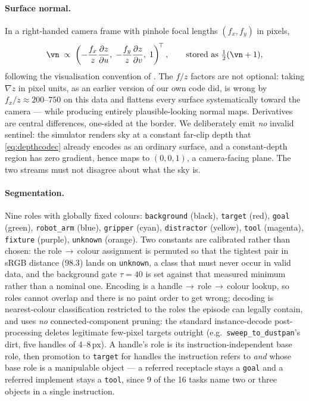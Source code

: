 \documentclass{article} %
\begin{document}
\paragraph{Surface normal.}
In a right-handed camera frame with pinhole focal lengths $(f_x,f_y)$ in pixels,
\begin{equation}
\vn \;\propto\; \left(-\frac{f_x}{z}\frac{\partial z}{\partial u},\;
-\frac{f_y}{z}\frac{\partial z}{\partial v},\; 1\right)^{\!\top},
\qquad \text{stored as } \tfrac12(\vn+1),
\label{eq:normal}
\end{equation}
following the visualisation convention of \citet{zhuang2025argus}. The $f/z$ factors are not
optional: taking $\nabla z$ in pixel units, as an earlier version of our own code did, is wrong by
$f_x/z \approx 200$--$750$ on this data and flattens every surface systematically toward the
camera --- while producing entirely plausible-looking normal maps. Derivatives are central
differences, one-sided at the border. We deliberately emit \emph{no} invalid sentinel: the
simulator renders sky at a constant far-clip depth that \eqref{eq:depthcodec} already encodes as an
ordinary surface, and a constant-depth region has zero gradient, hence maps to $(0,0,1)$, a
camera-facing plane. The two streams must not disagree about what the sky is.

\paragraph{Segmentation.}
Nine roles with globally fixed colours: \texttt{background} (black), \texttt{target} (red),
\texttt{goal} (green), \texttt{robot\_arm} (blue), \texttt{gripper} (cyan), \texttt{distractor}
(yellow), \texttt{tool} (magenta), \texttt{fixture} (purple), \texttt{unknown} (orange). Two
constants are calibrated rather than chosen: the role$\,\to\,$colour assignment is permuted so that
the tightest pair in sRGB distance ($98.3$) lands on \texttt{unknown}, a class that must never occur
in valid data, and the background gate $\tau = 40$ is set against that measured minimum rather than
a nominal one. Encoding is a handle$\,\to\,$role$\,\to\,$colour lookup, so roles cannot overlap and
there is no paint order to get wrong; decoding is nearest-colour classification restricted to the
roles the episode can legally contain, and uses \emph{no} connected-component pruning: the standard instance-decode
post-processing deletes legitimate few-pixel targets outright (e.g.\ \texttt{sweep\_to\_dustpan}'s
dirt, five handles of 4--8\,px). A handle's role is its instruction-independent base role, then
promotion to \texttt{target} for handles the instruction refers to \emph{and} whose base role is a
manipulable object --- a referred receptacle stays a \texttt{goal} and a referred implement stays a
\texttt{tool}, since 9 of the 16 tasks name two or three objects in a single instruction.
\end{document}
